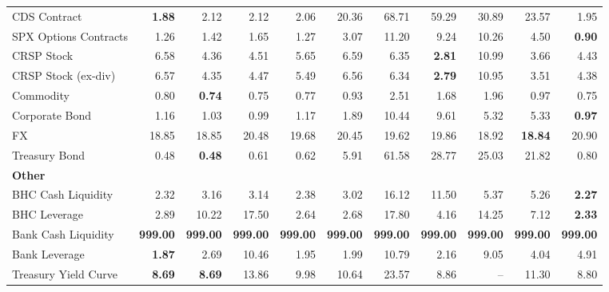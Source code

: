 \begin{table}[htbp]
\begin{tabular}{@{}lrrrrrrrrrr@{}}
CDS Contract & \textbf{1.88} & 2.12 & 2.12 & 2.06 & 20.36 & 68.71 & 59.29 & 30.89 & 23.57 & 1.95 \\
SPX Options Contracts & 1.26 & 1.42 & 1.65 & 1.27 & 3.07 & 11.20 & 9.24 & 10.26 & 4.50 & \textbf{0.90} \\
CRSP Stock & 6.58 & 4.36 & 4.51 & 5.65 & 6.59 & 6.35 & \textbf{2.81} & 10.99 & 3.66 & 4.43 \\
CRSP Stock (ex-div) & 6.57 & 4.35 & 4.47 & 5.49 & 6.56 & 6.34 & \textbf{2.79} & 10.95 & 3.51 & 4.38 \\
Commodity & 0.80 & \textbf{0.74} & 0.75 & 0.77 & 0.93 & 2.51 & 1.68 & 1.96 & 0.97 & 0.75 \\
Corporate Bond & 1.16 & 1.03 & 0.99 & 1.17 & 1.89 & 10.44 & 9.61 & 5.32 & 5.33 & \textbf{0.97} \\
FX & 18.85 & 18.85 & 20.48 & 19.68 & 20.45 & 19.62 & 19.86 & 18.92 & \textbf{18.84} & 20.90 \\
Treasury Bond & 0.48 & \textbf{0.48} & 0.61 & 0.62 & 5.91 & 61.58 & 28.77 & 25.03 & 21.82 & 0.80 \\
\midrule
\multicolumn{11}{l}{\textbf{Other}} \\
BHC Cash Liquidity & 2.32 & 3.16 & 3.14 & 2.38 & 3.02 & 16.12 & 11.50 & 5.37 & 5.26 & \textbf{2.27} \\
BHC Leverage & 2.89 & 10.22 & 17.50 & 2.64 & 2.68 & 17.80 & 4.16 & 14.25 & 7.12 & \textbf{2.33} \\
Bank Cash Liquidity & \textbf{999.00} & \textbf{999.00} & \textbf{999.00} & \textbf{999.00} & \textbf{999.00} & \textbf{999.00} & \textbf{999.00} & \textbf{999.00} & \textbf{999.00} & \textbf{999.00} \\
Bank Leverage & \textbf{1.87} & 2.69 & 10.46 & 1.95 & 1.99 & 10.79 & 2.16 & 9.05 & 4.04 & 4.91 \\
Treasury Yield Curve & \textbf{8.69} & \textbf{8.69} & 13.86 & 9.98 & 10.64 & 23.57 & 8.86 & -- & 11.30 & 8.80 \\
\bottomrule
\end{tabular}
\vspace{0.1cm}

\end{table}
